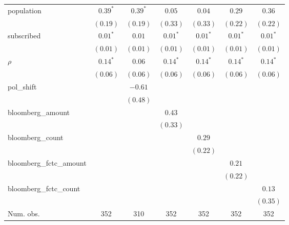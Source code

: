\begin{table}[!h]
\begin{center}
\begin{tabular}{l c c c c c c }
population              & $0.39^{*}$   & $0.39^{*}$   & $0.05$       & $0.04$       & $0.29$       & $0.36$       \\
                        & $(0.19)$     & $(0.19)$     & $(0.33)$     & $(0.33)$     & $(0.22)$     & $(0.22)$     \\
subscribed              & $0.01^{*}$   & $0.01$       & $0.01^{*}$   & $0.01^{*}$   & $0.01^{*}$   & $0.01^{*}$   \\
                        & $(0.01)$     & $(0.01)$     & $(0.01)$     & $(0.01)$     & $(0.01)$     & $(0.01)$     \\
$\rho$                  & $0.14^{*}$   & $0.06$       & $0.14^{*}$   & $0.14^{*}$   & $0.14^{*}$   & $0.14^{*}$   \\
                        & $(0.06)$     & $(0.06)$     & $(0.06)$     & $(0.06)$     & $(0.06)$     & $(0.06)$     \\
pol\_shift              &              & $-0.61$      &              &              &              &              \\
                        &              & $(0.48)$     &              &              &              &              \\
bloomberg\_amount       &              &              & $0.43$       &              &              &              \\
                        &              &              & $(0.33)$     &              &              &              \\
bloomberg\_count        &              &              &              & $0.29$       &              &              \\
                        &              &              &              & $(0.22)$     &              &              \\
bloomberg\_fctc\_amount &              &              &              &              & $0.21$       &              \\
                        &              &              &              &              & $(0.22)$     &              \\
bloomberg\_fctc\_count  &              &              &              &              &              & $0.13$       \\
                        &              &              &              &              &              & $(0.35)$     \\
\midrule
Num. obs.               & 352          & 310          & 352          & 352          & 352          & 352          \\

\end{tabular}
\end{center}
\end{table}
